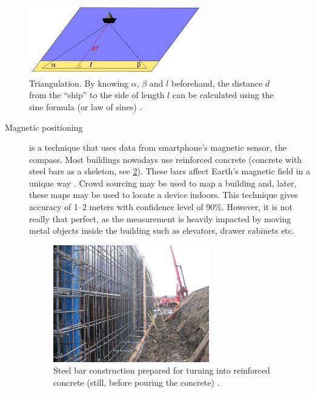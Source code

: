 \begin{figure}[h]
	\centering
	\includegraphics[width=0.67\textwidth]{triangulation}
	\caption{Triangulation. By knowing $\alpha$, $\beta$ and $l$ beforehand, the distance $d$ from the ``ship'' to the side of length $l$ can be calculated using the sine formula (or law of sines) \cite{wiki:triangulation}.}
	\label{fig:triangulation}
\end{figure}

\begin{description}
	\item[Magnetic positioning] is a technique that uses data from smartphone's magnetic sensor, the compass. Most buildings nowadays use reinforced concrete (concrete with steel bars as a skeleton, see \cref{fig:reinforced-concrete}). These bars affect Earth's magnetic field in a unique way \cite{Haverinen:magnetic}. Crowd sourcing may be used to map a building and, later, these maps may be used to locate a device indoors. This technique gives accuracy of 1--2 meters with confidence level of 90\%. However, it is not really that perfect, as the measurement is heavily impacted by moving metal objects inside the building such as elevators, drawer cabinets etc.
	
	\begin{figure}[h]
		\centering
		\includegraphics[width=0.67\textwidth]{reinforced-concrete}
		\caption{Steel bar construction prepared for turning into reinforced concrete (still, before pouring the concrete) \cite{penco:concrete}.}
		\label{fig:reinforced-concrete}
	\end{figure}
	

\end{description}
